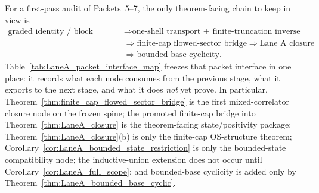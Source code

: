 For a first-pass audit of Packets~5--7, the only theorem-facing chain to keep in view is
\[
\begin{aligned}
\text{graded identity / block coefficients}
&\Longrightarrow \text{one-shell transport + finite-truncation inverse control}\\
&\Longrightarrow \text{finite-cap flowed-sector bridge}
\Longrightarrow \text{Lane~A closure}\\
&\Longrightarrow \text{bounded-base cyclicity}.
\end{aligned}
\]
Table~\ref{tab:LaneA_packet_interface_map} freezes that packet interface in one place: it records what each node consumes from the previous stage, what it exports to the next stage, and what it does \emph{not} yet prove. In particular, Theorem~\ref{thm:finite_cap_flowed_sector_bridge} is the first mixed-correlator closure node on the frozen spine; the promoted finite-cap bridge into Theorem~\ref{thm:LaneA_closure} is the theorem-facing state/positivity package; Theorem~\ref{thm:LaneA_closure}(b) is only the finite-cap OS-structure theorem; Corollary~\ref{cor:LaneA_bounded_state_restriction} is only the bounded-state compatibility node; the inductive-union extension does not occur until Corollary~\ref{cor:LaneA_full_scope}; and bounded-base cyclicity is added only by Theorem~\ref{thm:LaneA_bounded_base_cyclic}.


